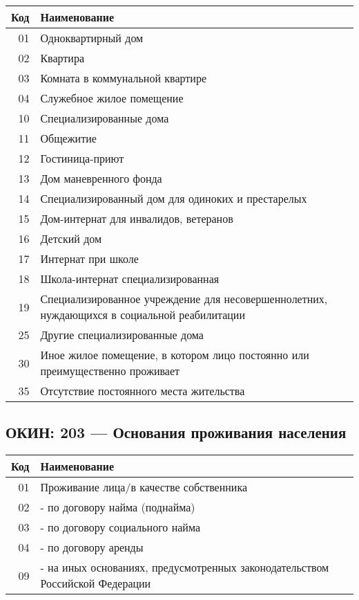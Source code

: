 \documentclass[10pt, a4paper, titlepage]{article}
\begin{document}
\begin{center}
    \begin{tabular}{rp{}}
        \hline
        \textbf{Код} & \textbf{Наименование} \\ \hline
        01 & Одноквартирный дом \\
        02 & Квартира \\
        03 & Комната в коммунальной квартире \\
        04 & Служебное жилое помещение \\
        10 & Специализированные дома \\
        11 & Общежитие \\
        12 & Гостиница-приют \\
        13 & Дом маневренного фонда \\
        14 & Специализированный дом для одиноких и престарелых \\
        15 & Дом-интернат для инвалидов, ветеранов \\
        16 & Детский дом \\
        17 & Интернат при школе \\
        18 & Школа-интернат специализированная \\
        19 & Специализированное учреждение для несовершеннолетних, нуждающихся в социальной реабилитации \\
        25 & Другие специализированные дома \\
        30 & Иное жилое помещение, в котором лицо постоянно или преимущественно проживает \\
        35 & Отсутствие постоянного места жительства \\
    \end{tabular}
\end{center}

\subsection{ОКИН: 203 --- Основания проживания населения}

\begin{center}
    \begin{tabular}{rp{}}
        \hline
        \textbf{Код} & \textbf{Наименование} \\ \hline
        01 & Проживание лица/в качестве собственника \\
        02 & - по договору найма (поднайма) \\
        03 & - по договору социального найма \\
        04 & - по договору аренды \\
        09 & - на иных основаниях, предусмотренных законодательством Российской Федерации \\
    \end{tabular}
\end{center}
\end{document}
